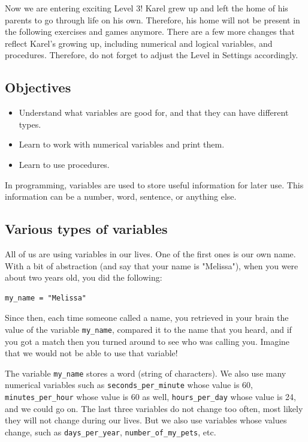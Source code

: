 \documentclass[article,A4,12pt]{llncs}
\begin{document}
{{{{Now we are entering exciting Level 3! Karel grew up and left the home of his 
parents to go through life on his own. Therefore, his home will not be present
in the following exercises and games anymore. There are a few more changes
that reflect Karel's growing up, including numerical and logical variables,
and procedures. Therefore, do not forget to adjust the 
Level in Settings accordingly.

\subsection{Objectives} 
 
\begin{itemize}
\item Understand what variables are good for, and that they can have different types.
\item Learn to work with numerical variables and print them.
\item Learn to use procedures. 
\end{itemize}

\noindent
In programming, variables are used to store useful information for later use. This information can 
be a number, word, sentence, or anything else. 

\subsection{Various types of variables}

All of us are using variables in our lives. One of 
the first ones is our own name. With a bit of abstraction (and say that your name is "Melissa"), 
when you were about two years old, you did the following:

\begin{verbatim}
my_name = "Melissa"
\end{verbatim}
Since then, each time someone called a name, you retrieved in your brain the value of the variable
{\tt my\_name}, compared it to the name that you heard, and if you got a match then you turned around 
to see who was calling you. Imagine that we would not be able to use that variable!

The variable {\tt my\_name} stores a word (string of characters). We also use many numerical variables such as
{\tt seconds\_per\_minute} whose value is 60, {\tt minutes\_per\_hour} whose value is 60 as well, 
{\tt hours\_per\_day} whose value is 24, and we could go on. The last three variables do not change 
too often, most likely they will not change during our lives. But we also use variables whose 
values change, such as {\tt days\_per\_year}, {\tt number\_of\_my\_pets}, etc.

}}}}
\end{document}
